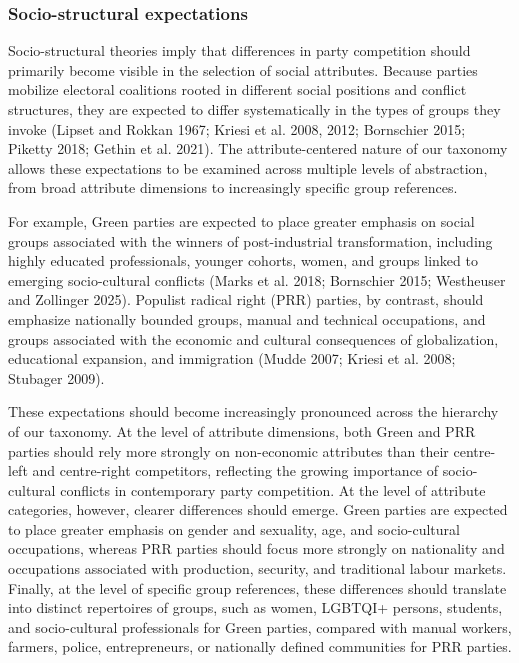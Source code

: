 \documentclass[12pt]{article}
\begin{document}
\subsubsection{Socio-structural expectations}\label{sec-structural_expectations}

Socio-structural theories imply that differences in party competition should primarily become visible in the selection of social attributes.
Because parties mobilize electoral coalitions rooted in different social positions and conflict structures, they are expected to differ systematically in the types of groups they invoke (Lipset and Rokkan 1967; Kriesi et al. 2008, 2012; Bornschier 2015; Piketty 2018; Gethin et al. 2021).
The attribute-centered nature of our taxonomy allows these expectations to be examined across multiple levels of abstraction, from broad attribute dimensions to increasingly specific group references.

For example, Green parties are expected to place greater emphasis on social groups associated with the winners of post-industrial transformation, including highly educated professionals, younger cohorts, women, and groups linked to emerging socio-cultural conflicts (Marks et al. 2018; Bornschier 2015; Westheuser and Zollinger 2025).
Populist radical right (PRR) parties, by contrast, should emphasize nationally bounded groups, manual and technical occupations, and groups associated with the economic and cultural consequences of globalization, educational expansion, and immigration (Mudde 2007; Kriesi et al. 2008; Stubager 2009).

These expectations should become increasingly pronounced across the hierarchy of our taxonomy.
At the level of attribute dimensions, both Green and PRR parties should rely more strongly on non-economic attributes than their centre-left and centre-right competitors, reflecting the growing importance of socio-cultural conflicts in contemporary party competition.
At the level of attribute categories, however, clearer differences should emerge.
Green parties are expected to place greater emphasis on gender and sexuality, age, and socio-cultural occupations, whereas PRR parties should focus more strongly on nationality and occupations associated with production, security, and traditional labour markets.
Finally, at the level of specific group references, these differences should translate into distinct repertoires of groups, such as women, LGBTQI+ persons, students, and socio-cultural professionals for Green parties, compared with manual workers, farmers, police, entrepreneurs, or nationally defined communities for PRR parties.
\end{document}
